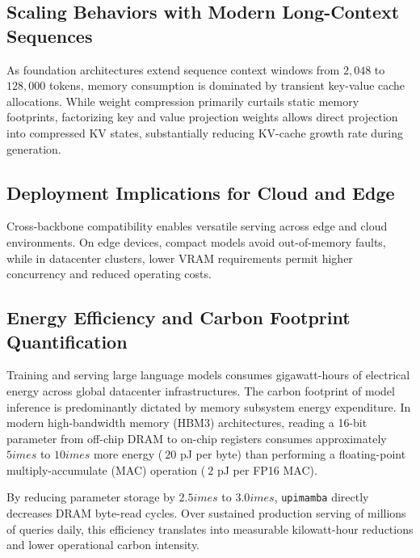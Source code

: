 \subsection{Scaling Behaviors with Modern Long-Context Sequences}
As foundation architectures extend sequence context windows from $2{,}048$ to $128{,}000$ tokens, memory consumption is dominated by transient key-value cache allocations. While weight compression primarily curtails static memory footprints, factorizing key and value projection weights allows direct projection into compressed KV states, substantially reducing KV-cache growth rate during generation.

\subsection{Deployment Implications for Cloud and Edge}
Cross-backbone compatibility enables versatile serving across edge and cloud environments. On edge devices, compact models avoid out-of-memory faults, while in datacenter clusters, lower VRAM requirements permit higher concurrency and reduced operating costs.

\subsection{Energy Efficiency and Carbon Footprint Quantification}
Training and serving large language models consumes gigawatt-hours of electrical energy across global datacenter infrastructures. The carbon footprint of model inference is predominantly dictated by memory subsystem energy expenditure. In modern high-bandwidth memory (HBM3) architectures, reading a 16-bit parameter from off-chip DRAM to on-chip registers consumes approximately $5	imes$ to $10	imes$ more energy ($~20$ pJ per byte) than performing a floating-point multiply-accumulate (MAC) operation ($~2$ pJ per FP16 MAC).

By reducing parameter storage by $2.5	imes$ to $3.0	imes$, \texttt{upimamba} directly decreases DRAM byte-read cycles. Over sustained production serving of millions of queries daily, this efficiency translates into measurable kilowatt-hour reductions and lower operational carbon intensity.
